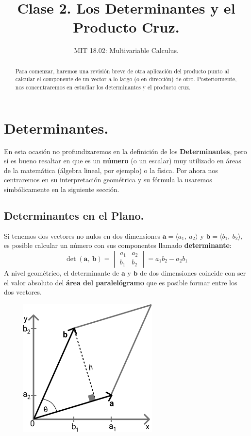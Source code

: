\documentclass[12pt]{article}
\title{Clase 2. Los Determinantes y el Producto Cruz.}
\author{MIT 18.02: Multivariable Calculus.}
\date{}
\begin{document}
\maketitle

\begin{abstract}
\noindent Para comenzar, haremos una revisión breve de otra aplicación del producto punto al calcular el componente de un vector a lo largo (o en dirección) de otro. Posteriormente, nos concentraremos en estudiar los determinantes y el producto cruz.
\end{abstract}


\section{Determinantes.}

En esta ocasión no profundizaremos en la definición de los \textbf{Determinantes}, pero sí es bueno resaltar en que es un \textbf{número} (o un escalar) muy utilizado en áreas de la matemática (álgebra lineal, por ejemplo) o la física. Por ahora nos centraremos en su interpretación geométrica y su fórmula la usaremos simbólicamente en la siguiente sección.

\subsection{Determinantes en el Plano.}

Si tenemos dos vectores no nulos en dos dimensiones $\mathbf{a} = \langle a_{1}, \ a_{2} \rangle$ y $\mathbf{b} = \langle b_{1}, \ b_{2} \rangle$, es posible calcular un número con sus componentes llamado \textbf{determinante}:
\[
\det(\mathbf{a}, \ \mathbf{b}) =
  \begin{vmatrix}
  a_{1} & a_{2} \\
  b_{1} & b_{2}
  \end{vmatrix} =
  a_{1}b_{2} - a_{2}b_{1}
\]
A nivel geométrico, el determinante de $\mathbf{a}$ y $\mathbf{b}$ de dos dimensiones coincide con ser el valor absoluto del \textbf{área del paralelógramo} que es posible formar entre los dos vectores.

\begin{figure}[hbt!]
\centering
\includegraphics[scale=0.6]{img/det-area-parallelog-1.jpg}
\end{figure}
\end{document}
